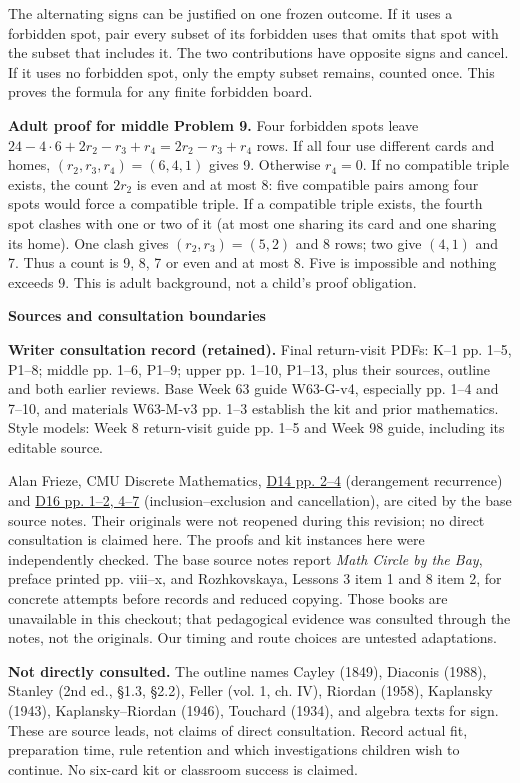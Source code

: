\documentclass[11pt]{article}
\newcommand{\sub}[1]{\par\textbf{#1}\par}
\begin{document}
The alternating signs can be justified on one frozen outcome. If it uses a forbidden spot, pair every subset of its forbidden uses that omits that spot with the subset that includes it. The two contributions have opposite signs and cancel. If it uses no forbidden spot, only the empty subset remains, counted once. This proves the formula for any finite forbidden board.

\textbf{Adult proof for middle Problem 9.} Four forbidden spots leave $24-4\cdot6+2r_2-r_3+r_4=2r_2-r_3+r_4$ rows. If all four use different cards and homes, $(r_2,r_3,r_4)=(6,4,1)$ gives 9. Otherwise $r_4=0$. If no compatible triple exists, the count $2r_2$ is even and at most 8: five compatible pairs among four spots would force a compatible triple. If a compatible triple exists, the fourth spot clashes with one or two of it (at most one sharing its card and one sharing its home). One clash gives $(r_2,r_3)=(5,2)$ and 8 rows; two give $(4,1)$ and 7. Thus a count is 9, 8, 7 or even and at most 8. Five is impossible and nothing exceeds 9. This is adult background, not a child's proof obligation.

\sub{Sources and consultation boundaries}
\small
\textbf{Writer consultation record (retained).} Final return-visit PDFs: K--1 pp. 1--5, P1--8; middle pp. 1--6, P1--9; upper pp. 1--10, P1--13, plus their sources, outline and both earlier reviews. Base Week 63 guide W63-G-v4, especially pp. 1--4 and 7--10, and materials W63-M-v3 pp. 1--3 establish the kit and prior mathematics. Style models: Week 8 return-visit guide pp. 1--5 and Week 98 guide, including its editable source.

Alan Frieze, CMU Discrete Mathematics, \href{https://www.math.cmu.edu/~af1p/Teaching/DM/D14.pdf}{D14 pp. 2--4} (derangement recurrence) and \href{https://www.math.cmu.edu/~af1p/Teaching/DM/D16.pdf}{D16 pp. 1--2, 4--7} (inclusion--exclusion and cancellation), are cited by the base source notes. Their originals were not reopened during this revision; no direct consultation is claimed here. The proofs and kit instances here were independently checked. The base source notes report \emph{Math Circle by the Bay}, preface printed pp. viii--x, and Rozhkovskaya, Lessons 3 item 1 and 8 item 2, for concrete attempts before records and reduced copying. Those books are unavailable in this checkout; that pedagogical evidence was consulted through the notes, not the originals. Our timing and route choices are untested adaptations.

\textbf{Not directly consulted.} The outline names Cayley (1849), Diaconis (1988), Stanley (2nd ed., \S1.3, \S2.2), Feller (vol. 1, ch. IV), Riordan (1958), Kaplansky (1943), Kaplansky--Riordan (1946), Touchard (1934), and algebra texts for sign. These are source leads, not claims of direct consultation. Record actual fit, preparation time, rule retention and which investigations children wish to continue. No six-card kit or classroom success is claimed.
\end{document}
